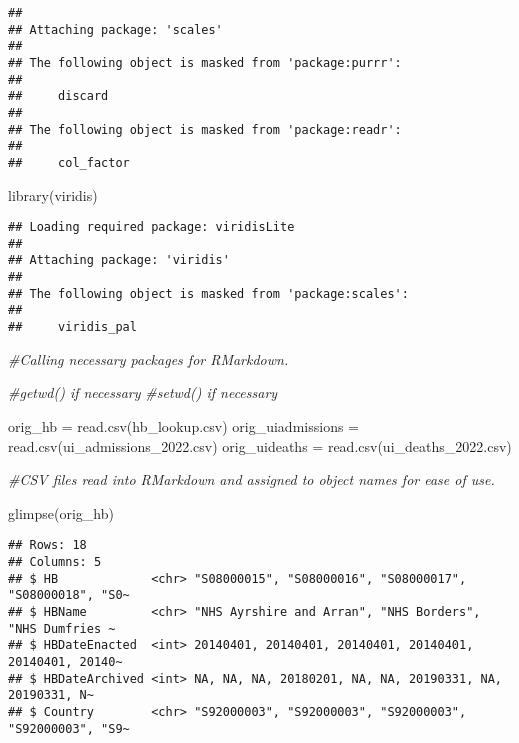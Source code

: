 \documentclass[
]{article}
\newenvironment{Shaded}{\begin{snugshade}}{\end{snugshade}}
\newcommand{\CommentTok}[1]{\textcolor[rgb]{0.56,0.35,0.01}{\textit{#1}}}
\newcommand{\FunctionTok}[1]{\textcolor[rgb]{0.00,0.00,0.00}{#1}}
\newcommand{\NormalTok}[1]{#1}
\newcommand{\OtherTok}[1]{\textcolor[rgb]{0.56,0.35,0.01}{#1}}
\newcommand{\StringTok}[1]{\textcolor[rgb]{0.31,0.60,0.02}{#1}}
\begin{document}
\begin{verbatim}
## 
## Attaching package: 'scales'
## 
## The following object is masked from 'package:purrr':
## 
##     discard
## 
## The following object is masked from 'package:readr':
## 
##     col_factor
\end{verbatim}

\begin{Shaded}
\begin{Highlighting}[]
\FunctionTok{library}\NormalTok{(viridis)}
\end{Highlighting}
\end{Shaded}

\begin{verbatim}
## Loading required package: viridisLite
## 
## Attaching package: 'viridis'
## 
## The following object is masked from 'package:scales':
## 
##     viridis_pal
\end{verbatim}

\begin{Shaded}
\begin{Highlighting}[]
\CommentTok{\#Calling necessary packages for RMarkdown.}

\CommentTok{\#getwd() if necessary}
\CommentTok{\#setwd() if necessary}

\NormalTok{orig\_hb }\OtherTok{=} \FunctionTok{read.csv}\NormalTok{(}\StringTok{\textquotesingle{}hb\_lookup.csv\textquotesingle{}}\NormalTok{)}
\NormalTok{orig\_uiadmissions }\OtherTok{=} \FunctionTok{read.csv}\NormalTok{(}\StringTok{\textquotesingle{}ui\_admissions\_2022.csv\textquotesingle{}}\NormalTok{)}
\NormalTok{orig\_uideaths }\OtherTok{=} \FunctionTok{read.csv}\NormalTok{(}\StringTok{\textquotesingle{}ui\_deaths\_2022.csv\textquotesingle{}}\NormalTok{)}

\CommentTok{\#CSV files read into RMarkdown and assigned to object names for ease of use.}

\FunctionTok{glimpse}\NormalTok{(orig\_hb) }
\end{Highlighting}
\end{Shaded}

\begin{verbatim}
## Rows: 18
## Columns: 5
## $ HB             <chr> "S08000015", "S08000016", "S08000017", "S08000018", "S0~
## $ HBName         <chr> "NHS Ayrshire and Arran", "NHS Borders", "NHS Dumfries ~
## $ HBDateEnacted  <int> 20140401, 20140401, 20140401, 20140401, 20140401, 20140~
## $ HBDateArchived <int> NA, NA, NA, 20180201, NA, NA, 20190331, NA, 20190331, N~
## $ Country        <chr> "S92000003", "S92000003", "S92000003", "S92000003", "S9~
\end{verbatim}
\end{document}
